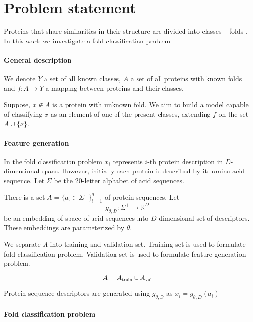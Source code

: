 \documentclass[12pt, twoside]{article}
\begin{document}
\section{Problem statement}
\noindent
Proteins that share similarities in their structure are  divided into classes -- folds \cite{Schaeffer2011}. In this work we investigate a fold classification problem.

\paragraph{General description}
\noindent
  

We denote $Y$ a set of all known classes, $A$ a set of all proteins with known folds and  $f: A \rightarrow Y$ a mapping between proteins and their classes. 

Suppose, $x \not\in A$ is a protein with unknown fold. We aim to build a model capable of classifying $x$ as an element of one of the present classes, extending $f$ on the set $A \cup \{x\}$. 

\paragraph{Feature generation }
\noindent

In the fold classification problem $x_i$ represents $i$-th protein description in  $D$-dimensional space. However, initially each protein is described by its amino acid sequence. Let $\Sigma$ be the 20-letter alphabet of acid sequences.  

There is a set $A = \{a_i \in \Sigma^+\}_{i = 1}^n$ of protein sequences. Let $$g_{\theta, D}: \Sigma^+ \rightarrow \mathbb{R}^D$$ be an embedding of space of acid sequences into $D$-dimensional set of descriptors. These embeddings are parameterized  by $\theta$.

We separate $A$ into training and validation set. Training set is used to formulate fold classification problem. Validation set is used to formulate feature generation problem. 

$$A = A_{\text{train}} \cup A_{\text{val}}$$

Protein sequence descriptors are generated using $g_{\theta, D}$ as $x_i = g_{\theta, D}(a_i)$ 

\paragraph{Fold classification problem}
\noindent
\end{document}
